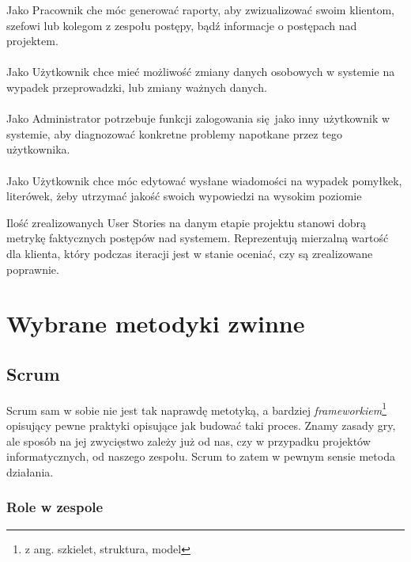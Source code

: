 \documentclass{article}
\begin{document}
\begin{center}
    Jako Pracownik che móc generować raporty, aby zwizualizować swoim klientom, szefowi lub kolegom z zespołu postępy, bądź informacje o postępach nad projektem.

    \paragraph{}
    Jako Użytkownik chce mieć możliwość zmiany danych osobowych w systemie na wypadek przeprowadzki, lub zmiany ważnych danych.

    \paragraph{}
    Jako Administrator potrzebuje funkcji zalogowania się jako inny użytkownik w systemie, aby diagnozować konkretne problemy napotkane przez tego użytkownika.

    \paragraph{}
    Jako Użytkownik chce móc edytować wysłane wiadomości na wypadek pomyłkek, literówek, żeby utrzymać jakość swoich wypowiedzi na wysokim poziomie

\end{center}

Ilość zrealizowanych User Stories na danym etapie projektu stanowi dobrą metrykę faktycznych postępów nad systemem. Reprezentują mierzalną wartość dla klienta, który podczas iteracji jest w stanie oceniać, czy są zrealizowane poprawnie.

\section{Wybrane metodyki zwinne}

\subsection{Scrum}

Scrum sam w sobie nie jest tak naprawdę metotyką, a bardziej \textit{frameworkiem}\footnote{z ang. szkielet, struktura, model} opisujący pewne praktyki opisujące jak budować taki proces\cite{scrum}. Znamy zasady gry, ale sposób na jej zwycięstwo zależy już od nas, czy w przypadku projektów informatycznych, od naszego zespołu. Scrum to zatem w pewnym sensie metoda działania.

\subsubsection{Role w zespole}
\end{document}
